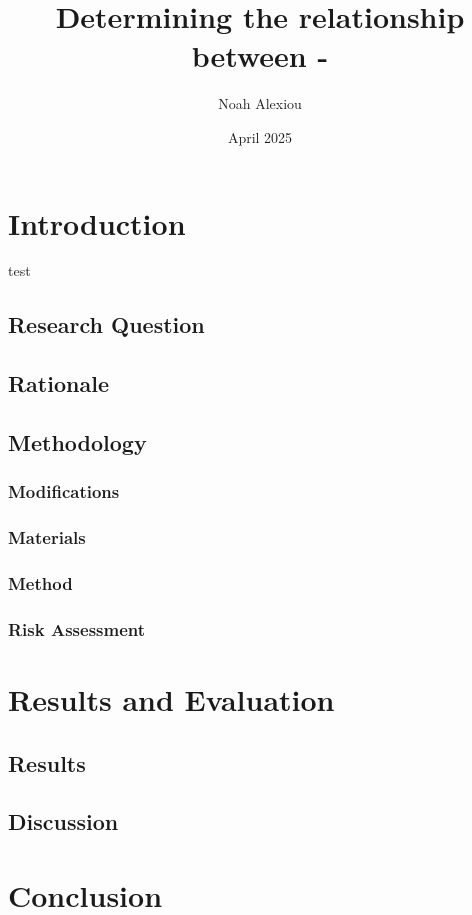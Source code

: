 \documentclass[11pt,a4paper]{article}
\begin{document}
\begin{titlepage}


\title{Determining the relationship between - }

\author{Noah Alexiou}


\date{April 2025}

\maketitle
\centering

\end{titlepage}
\tableofcontents
\newpage

\section{Introduction}
test
\subsection{Research Question}

\subsection{Rationale}

\subsection{Methodology}

\subsubsection{Modifications}

\subsubsection{Materials}

\subsubsection{Method}

\subsubsection{Risk Assessment}

\section{Results and Evaluation}
\subsection{Results}
\subsection{Discussion}


\section{Conclusion}

	
	
	
\end{document}
